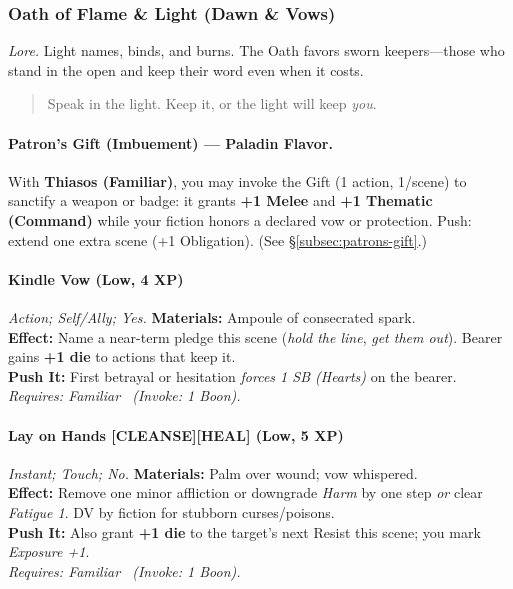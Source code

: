 \subsubsection{Oath of Flame \& Light (Dawn \& Vows)}
\textit{Lore.} Light names, binds, and burns. The Oath favors sworn keepers—those who stand in the open and keep their word even when it costs.

\begin{quote}
Speak in the light. Keep it, or the light will keep \emph{you}.
\end{quote}

\paragraph*{Patron’s Gift (Imbuement) — Paladin Flavor.}
With \textbf{Thiasos (Familiar)}, you may invoke the Gift (1 action, 1/scene) to sanctify a weapon or badge: it grants \textbf{+1 Melee} and \textbf{+1 Thematic (Command)} while your fiction honors a declared vow or protection. Push: extend one extra scene (+1 Obligation). (See \S\ref{subsec:patrons-gift}.)

\paragraph{Kindle Vow (Low, 4 XP)} \emph{Action; Self/Ally; Yes.}
\textbf{Materials:} Ampoule of consecrated spark.\\
\textbf{Effect:} Name a near-term pledge this scene (\emph{hold the line}, \emph{get them out}). Bearer gains \textbf{+1 die} to actions that keep it.\\
\textbf{Push It:} First betrayal or hesitation \emph{forces 1 SB (Hearts)} on the bearer.\\
\emph{Requires: Familiar \ (\textit{Invoke:} 1 Boon).}

\paragraph{Lay on Hands \textnormal{[CLEANSE][HEAL]} (Low, 5 XP)} \emph{Instant; Touch; No.}
\textbf{Materials:} Palm over wound; vow whispered.\\
\textbf{Effect:} Remove one minor affliction or downgrade \emph{Harm} by one step \emph{or} clear \emph{Fatigue 1}. DV by fiction for stubborn curses/poisons.\\
\textbf{Push It:} Also grant \textbf{+1 die} to the target’s next Resist this scene; you mark \emph{Exposure +1}.\\
\emph{Requires: Familiar \ (\textit{Invoke:} 1 Boon).}

